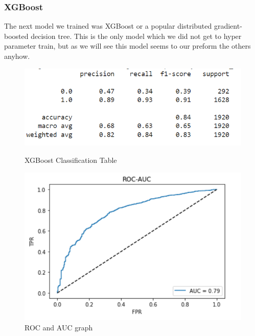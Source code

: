 \documentclass[12pt]{article}
\begin{document}
\subsubsection{XGBoost}

\noindent The next model we trained was XGBoost or a popular distributed gradient-boosted decision tree. This is the only model which we did not get to hyper parameter train, but as we will see this model seems to our preform the others anyhow.
\begin{figure}[H]
    \centering
    \begin{minipage}[b]{0.5\textwidth}
        \includegraphics[scale = .45]{figures/XGBTable.png}
        \caption{XGBoost Classification Table}
    \end{minipage}
    \hfill
    \begin{minipage}[b]{0.4\textwidth}
        \includegraphics[scale = .30]{figures/XGB_roc.png}
        \caption{ROC and AUC graph}
    \end{minipage}
\end{figure}
\end{document}
